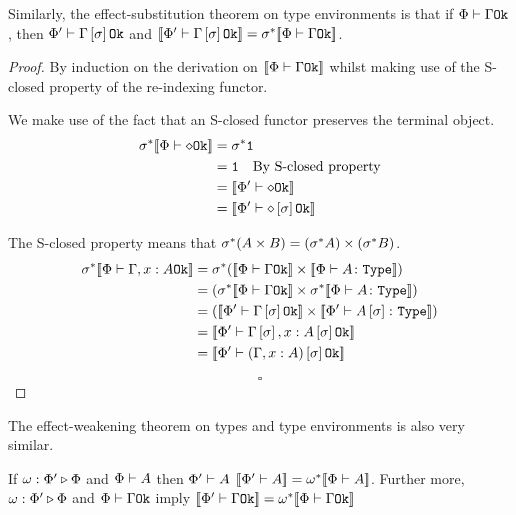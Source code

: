 \documentclass{Report}
\begin{document}
\begin{theorem}
    Similarly, the effect-substitution theorem on type environments is that if $\Phi\vdash \Gamma \texttt{Ok}$, then $\Phi'\vdash \Gamma\left[\sigma\right] \texttt{Ok}$ and ${\bf [\![}\Phi'\vdash \Gamma\left[\sigma\right] \texttt{Ok}{\bf ]\!]} = \sigma^*{\bf [\![}\Phi\vdash \Gamma \texttt{Ok}{\bf ]\!]}$.
\end{theorem}

\begin{proof}
    By induction on the derivation on ${\bf [\![}\Phi\vdash \Gamma \texttt{Ok}{\bf ]\!]}$ whilst making use of the S-closed property of the re-indexing functor.

    We make use of the fact that an S-closed functor preserves the terminal object.
    \begin{align}
        \sigma^*{\bf [\![}\Phi\vdash \diamond \texttt{Ok}{\bf ]\!]} &=\sigma^*\texttt{1}\\
        & = \texttt{1}\quad\text{By S-closed property}\\
        &= {\bf [\![}\Phi'\vdash \diamond \texttt{Ok}{\bf ]\!]}\\
        &= {\bf [\![}\Phi'\vdash \diamond\left[\sigma\right] \texttt{Ok}{\bf ]\!]}\\
    \end{align}
    
    The S-closed property means that $\sigma^*(A \times B) = (\sigma^* A)\times (\sigma^* B)$.
    \begin{align}
       \si\star\deno{\wellformedok{\P}{\gax}} &= \si\star(\deno{\wellformedok{\P}{\G}} \times \deno{\typerelation{\P}{A}{\type}}) \\
       & = (\si\star\deno{\wellformedok{\P}{\G}} \times \si\star\deno{\typerelation{\P}{A}{\type}})\\
        & = (\deno{\wellformedok{\P'}{\G\ssi}} \times \deno{\typerelation{\P'}{A\ssi}{\type}})\\
        & = \deno{\wellformedok{\P'}{\G\ssi, x: A\ssi}}\\
        & = \deno{\wellformedok{\P'}{(\gax)\ssi}}\\
    \end{align}

    $$\square$$
\end{proof}


The effect-weakening theorem on types and type environments is also very similar.

\begin{theorem}
    If $\omega : \Phi' \triangleright \Phi$ and $\Phi\vdash A$ then $\Phi'\vdash A$ ${\bf [\![}\Phi'\vdash A{\bf ]\!]} = \omega^*{\bf [\![}\Phi\vdash A{\bf ]\!]}$. Further more, $\omega : \Phi' \triangleright \Phi$ and $\Phi\vdash \Gamma \texttt{Ok}$ imply ${\bf [\![}\Phi'\vdash \Gamma \texttt{Ok}{\bf ]\!]} = \omega^*{\bf [\![}\Phi\vdash \Gamma \texttt{Ok}{\bf ]\!]}$
\end{theorem}
\end{document}
